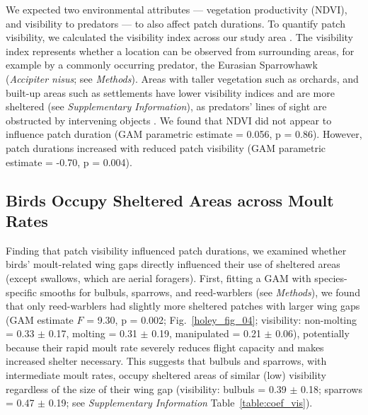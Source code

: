 We expected two environmental attributes --- vegetation productivity (NDVI), and visibility to predators --- to also affect patch durations.
To quantify patch visibility, we calculated the visibility index across our study area \parencite{olsoy2015,aben2018,aben2021}.
The visibility index represents whether a location can be observed from surrounding areas, for example by a commonly occurring predator, the Eurasian Sparrowhawk (\textit{Accipiter nisus}; see \textit{Methods}).
Areas with taller vegetation such as orchards, and built-up areas such as settlements have lower visibility indices and are more sheltered (see \textit{Supplementary Information}), as predators' lines of sight are obstructed by intervening objects \parencite{olsoy2015}.
We found that NDVI did not appear to influence patch duration (GAM parametric estimate = 0.056, p = 0.86).
However, patch durations increased with reduced patch visibility (GAM parametric estimate = -0.70, p = 0.004).

\subsection*{Birds Occupy Sheltered Areas across Moult Rates}

Finding that patch visibility influenced patch durations, we examined whether birds' moult-related wing gaps directly influenced their use of sheltered areas (except swallows, which are aerial foragers).
First, fitting a GAM with species-specific smooths for bulbuls, sparrows, and reed-warblers (see \textit{Methods}), we found that only reed-warblers had slightly more sheltered patches with larger wing gaps (GAM estimate $F$ = 9.30, p = 0.002; Fig.~\ref{holey_fig_04}; visibility: non-molting = 0.33 $\pm$ 0.17, molting = 0.31 $\pm$ 0.19, manipulated = 0.21 $\pm$ 0.06), potentially because their rapid moult rate severely reduces flight capacity and makes increased shelter necessary.
This suggests that bulbuls and sparrows, with intermediate moult rates, occupy sheltered areas of similar (low) visibility regardless of the size of their wing gap (visibility: bulbuls =  0.39 $\pm$ 0.18; sparrows = 0.47 $\pm$ 0.19; see \textit{Supplementary Information} Table~\ref{table:coef_vis}).

